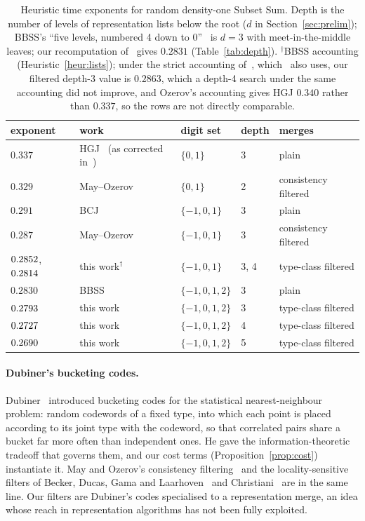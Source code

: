 \documentclass[11pt]{article}
\theoremstyle{definition}
\theoremstyle{remark}
\begin{document}
\begin{table}[ht]
\centering
\begin{tabular}{lllll}
\toprule
exponent & work & digit set & depth & merges \\
\midrule
$0.337$ & HGJ~\cite{HGJ10} (as corrected in~\cite{BCJ11}) & $\{0,1\}$ & 3 & plain \\
$0.329$ & May--Ozerov~\cite{Oze16} & $\{0,1\}$ & 2 & consistency filtered \\
$0.291$ & BCJ~\cite{BCJ11} & $\{-1,0,1\}$ & 3 & plain \\
$0.287$ & May--Ozerov~\cite{Oze16} & $\{-1,0,1\}$ & 3 & consistency filtered \\
$0.2852$, $0.2814$ & this work$^\dagger$ & $\{-1,0,1\}$ & 3, 4 & type-class filtered \\
\addlinespace
$0.2830$ & BBSS~\cite{BBSS20} & $\{-1,0,1,2\}$ & 3 & plain \\
\midrule
$0.2793$ & this work & $\{-1,0,1,2\}$ & 3 & type-class filtered \\
$0.2727$ & this work & $\{-1,0,1,2\}$ & 4 & type-class filtered \\
$0.2690$ & this work & $\{-1,0,1,2\}$ & $5$ & type-class filtered \\
\bottomrule
\end{tabular}
\caption{Heuristic time exponents for random density-one Subset Sum. Depth is the number of levels of
representation lists below the root ($d$ in Section~\ref{sec:prelim}); BBSS's ``five levels, numbered 4 down to
0''~\cite[\S2.5]{BBSS20} is $d=3$ with meet-in-the-middle leaves; our recomputation of~\cite{BBSS20} gives $0.2831$
(Table~\ref{tab:depth}). $^\dagger$BBSS accounting (Heuristic~\ref{heur:lists}); under the strict
accounting of~\cite{BCJ11}, which~\cite{Oze16} also uses, our filtered depth-3 value is $0.2863$, which a depth-4 search under the same accounting did not improve, and
Ozerov's accounting gives HGJ $0.340$ rather than $0.337$, so the rows are not directly comparable.}
\label{tab:history}
\end{table}

\paragraph{Dubiner's bucketing codes.} Dubiner~\cite{Dub10} introduced bucketing codes for the statistical
nearest-neighbour problem: random codewords of a fixed type, into which each point is placed according to its joint
type with the codeword, so that correlated pairs share a bucket far more often than independent ones. He gave the
information-theoretic tradeoff that governs them, and our cost terms (Proposition~\ref{prop:cost}) instantiate it.
May and Ozerov's consistency filtering~\cite{Oze16} and the locality-sensitive filters of Becker, Ducas, Gama and
Laarhoven~\cite{BDGL16} and Christiani~\cite{Chr17} are in the same line. Our filters are Dubiner's codes specialised
to a representation merge, an idea whose reach in representation algorithms has not been fully exploited.
\end{document}
